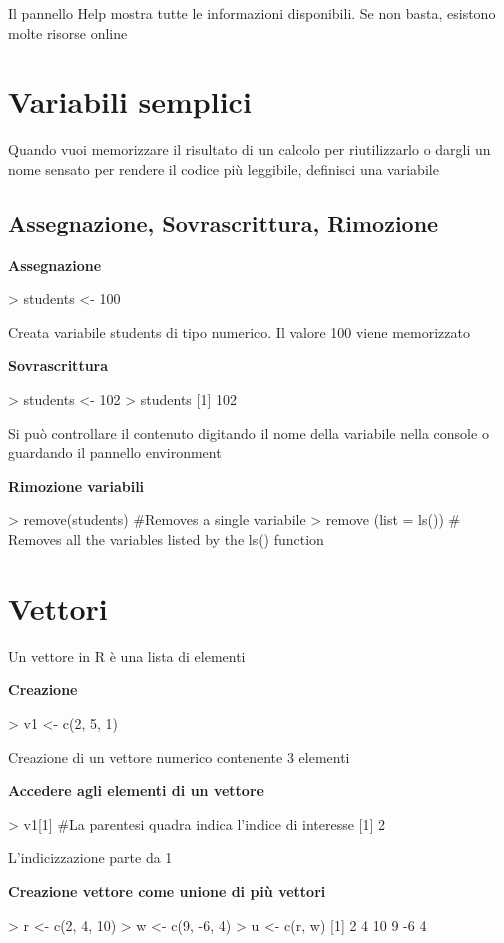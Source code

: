 Il pannello Help mostra tutte le informazioni disponibili. Se non basta, esistono molte risorse online

\section{Variabili semplici}
Quando
vuoi memorizzare il risultato di un calcolo per riutilizzarlo o dargli un nome sensato per
rendere il codice più leggibile, definisci una variabile

\subsection{Assegnazione, Sovrascrittura, Rimozione}

\textbf{\large Assegnazione}
\begin{codiceR}
  > students <- 100
\end{codiceR}
Creata variabile students di tipo numerico. Il valore 100 viene memorizzato

\textbf{\large Sovrascrittura}
\begin{codiceR}
  > students <- 102
> students
  [1] 102
\end{codiceR}
Si può controllare il contenuto digitando il nome della variabile nella console o guardando il pannello environment

\textbf{\large Rimozione variabili}
\begin{codiceR}
  > remove(students)      #Removes a single variabile
> remove (list = ls())  # Removes all the variables listed by the ls() function
\end{codiceR}

\section{Vettori}
Un vettore in R è una lista di elementi

\textbf{\large Creazione}
\begin{codiceR}
  > v1 <- c(2, 5, 1)
\end{codiceR}
Creazione di un vettore numerico contenente 3 elementi

\textbf{\large Accedere agli elementi di un vettore}
\begin{codiceR}
  > v1[1]   #La parentesi quadra indica l'indice di interesse
  [1] 2
\end{codiceR}
L'indicizzazione parte da 1

\textbf{\large Creazione vettore come unione di più vettori}
\begin{codiceR}
  > r <- c(2, 4, 10)
> w <- c(9, -6, 4)
> u <- c(r, w)
  [1] 2 4 10 9 -6 4
\end{codiceR}

